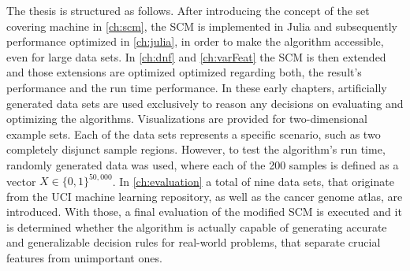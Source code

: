 The thesis is structured as follows.
After introducing the concept of the set covering machine in \autoref{ch:scm},
the SCM is implemented in Julia and subsequently performance optimized in \autoref{ch:julia}, in order to
make the algorithm accessible, even for large data sets.
In \autoref{ch:dnf} and \autoref{ch:varFeat} the SCM is then extended and those
extensions are optimized optimized regarding both, the result's performance and the run time performance.
In these early chapters, artificially generated data sets are used exclusively to reason any decisions on evaluating and optimizing the algorithms.
Visualizations are provided for two-dimensional example sets.
Each of the data sets represents a specific scenario, such as two completely disjunct sample regions.
However, to test the algorithm's run time, randomly generated data was used, where each of the 200 samples is defined
as a vector \(X \in \lbrace0,1\rbrace^{50,000}\).
In \autoref{ch:evaluation} a total of nine data sets, that originate from
the UCI machine learning repository, as well as the cancer genome atlas, are introduced.
With those, a final evaluation of the modified SCM is executed and it is determined whether the algorithm
is actually capable of generating accurate and generalizable decision rules for real-world problems,
that separate crucial features from unimportant ones.